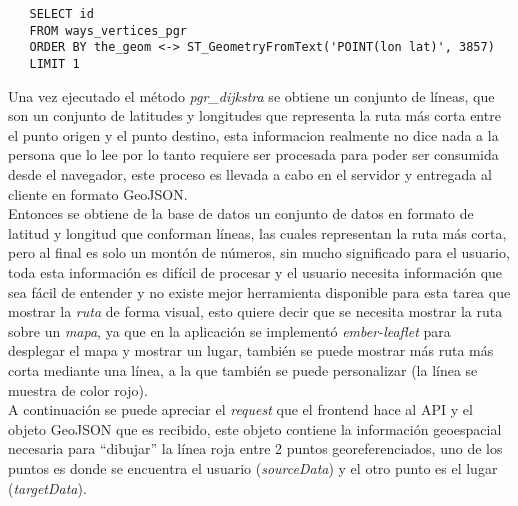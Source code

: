 \begin{verbatim}
   SELECT id
   FROM ways_vertices_pgr
   ORDER BY the_geom <-> ST_GeometryFromText('POINT(lon lat)', 3857)
   LIMIT 1
\end{verbatim}

Una vez ejecutado el método \emph{pgr\_dijkstra} se obtiene un conjunto de líneas, que son un conjunto de latitudes y longitudes que representa la ruta más corta entre el punto origen y el punto destino, esta informacion realmente no dice nada a la persona que lo lee por lo tanto requiere ser procesada para poder ser consumida desde el navegador, este proceso es llevada a cabo en el servidor y entregada al cliente en formato GeoJSON.\\







Entonces se obtiene
de la base de datos un conjunto de datos en formato de latitud y longitud que conforman líneas, las cuales representan la ruta más corta, pero al final es solo un montón de números, sin mucho significado para el usuario, toda esta información es difícil de procesar y el usuario necesita información que sea fácil de entender y no existe mejor herramienta disponible para esta tarea que mostrar la \emph{ruta} de forma visual, esto quiere decir que se necesita mostrar la ruta sobre un \emph{mapa}, ya que en la aplicación se implementó \emph{ember-leaflet} para desplegar el mapa y mostrar un lugar, también se puede  mostrar más ruta más corta mediante una línea, a la que también se puede personalizar (la línea se muestra de color rojo).\\

A continuación se puede apreciar el \emph{request} que el frontend hace al API y  el objeto GeoJSON que es recibido, este objeto contiene la información geoespacial necesaria para ``dibujar'' la línea roja entre 2 puntos georeferenciados, uno de los puntos es donde se encuentra el usuario (\emph{sourceData}) y el otro punto es el lugar (\emph{targetData}).




